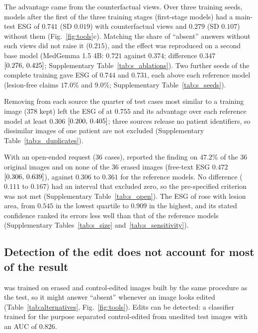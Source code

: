 The advantage came from the counterfactual views.
Over three training seeds, models after the first of the three training stages (first-stage models) had a main-test ESG of $0.741$ (SD $0.019$) with counterfactual views and $0.279$ (SD $0.107$) without them (Fig.~\ref{fig:tools}c).
Matching the share of ``absent'' answers without such views did not raise it ($0.215$), and the effect was reproduced on a second base model (MedGemma 1.5 4B: $0.721$ against $0.374$; difference $0.347$ $[0.276,\,0.425]$; Supplementary Table~\ref{tab:s_ablations}).
Two further seeds of the complete training gave ESG of $0.744$ and $0.731$, each above each reference model (lesion-free claims $17.0\%$ and $9.0\%$; Supplementary Table~\ref{tab:s_seeds}).

Removing from each source the quarter of test cases most similar to a training image (378 kept) left the ESG of \ms{} at $0.755$ and its advantage over each reference model at least $0.306$ $[0.200,\,0.405]$; three sources release no patient identifiers, so dissimilar images of one patient are not excluded (Supplementary Table~\ref{tab:s_duplicates}).

With an open-ended request (36 cases), \ms{} reported the finding on $47.2\%$ of the 36 original images and on none of the 36 erased images (free-text ESG $0.472$ $[0.306,\,0.639]$), against $0.306$ to $0.361$ for the reference models.
No difference ($0.111$ to $0.167$) had an interval that excluded zero, so the pre-specified criterion was not met (Supplementary Table~\ref{tab:s_open}).
The ESG of \ms{} rose with lesion area, from $0.545$ in the lowest quartile to $0.909$ in the highest, and its stated confidence ranked its errors less well than that of the reference models (Supplementary Tables~\ref{tab:s_size} and~\ref{tab:s_sensitivity}).

\subsection{Detection of the edit does not account for most of the result}\label{subsec:res_alternatives}

\ms{} was trained on erased and control-edited images built by the same procedure as the test, so it might answer ``absent'' whenever an image looks edited (Table~\ref{tab:alternatives}, Fig.~\ref{fig:tools}).
Edits can be detected: a classifier trained for the purpose separated control-edited from unedited test images with an AUC of $0.826$.


